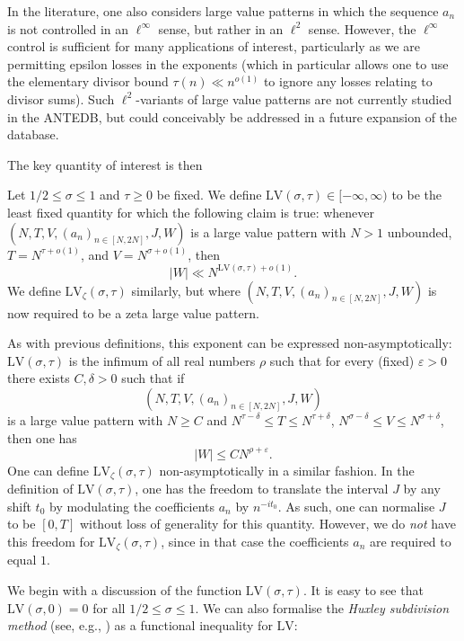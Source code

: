 \documentclass[a4paper, 10pt]{amsart}
\newcommand{\eps}{\varepsilon}
\newcommand{\LV}{\mathrm{LV}}
\begin{document}
\begin{remark}  In the literature, one also considers large value patterns in which the sequence $a_n$ is not controlled in an $\ell^\infty$ sense, but rather in an $\ell^2$ sense.  However, the $\ell^\infty$ control is sufficient for many applications of interest, particularly as we are permitting epsilon losses in the exponents (which in particular allows one to use the elementary divisor bound $\tau(n) \ll n^{o(1)}$ to ignore any losses relating to divisor sums).  Such $\ell^2$-variants of large value patterns are not currently studied in the ANTEDB, but could conceivably be addressed in a future expansion of the database.
\end{remark}

The key quantity of interest is then

\begin{definition}\label{lv-def} Let $1/2 \leq \sigma \leq 1$ and $\tau \geq 0$ be fixed. We define $\LV(\sigma,\tau) \in [-\infty,\infty)$ to be the least fixed quantity for which the following claim is true: whenever $(N,T,V,(a_n)_{n \in [N,2N]},J,W)$ is a large value pattern with $N>1$ unbounded, $T = N^{\tau+o(1)}$, and $V = N^{\sigma+o(1)}$, then
$$ |W| \ll N^{\LV(\sigma,\tau)+o(1)}.$$
We define $\LV_\zeta(\sigma,\tau)$ similarly, but where $(N,T,V,(a_n)_{n \in [N,2N]},J,W)$ is now required to be a zeta large value pattern.
\end{definition}

As with previous definitions, this exponent can be expressed non-asymptotically: $\LV(\sigma,\tau)$ is the infimum of all real numbers $\rho$ such that for every (fixed)  $\eps>0$ there exists $C, \delta>0$ such that if
$$(N,T,V,(a_n)_{n \in [N,2N]},J,W)$$
is a large value pattern with $N \geq C$ and $N^{\tau-\delta} \leq T \leq N^{\tau+\delta}$, $N^{\sigma-\delta} \leq V \leq N^{\sigma+\delta}$, then one has
$$ |W| \leq C N^{\rho+\eps}.$$
One can define $\LV_\zeta(\sigma,\tau)$ non-asymptotically in a similar fashion.
In the definition of $\LV(\sigma,\tau)$, one has the freedom to translate the interval $J$ by any shift $t_0$ by modulating the coefficients $a_n$ by $n^{-it_0}$.  As such, one can normalise $J$ to be $[0,T]$ without loss of generality for this quantity.  However, we do \emph{not} have this freedom for $\LV_\zeta(\sigma,\tau)$, since in that case the coefficients $a_n$ are required to equal $1$.

We begin with a discussion of the function $\LV(\sigma,\tau)$.
It is easy to see that $\LV(\sigma,0)=0$ for all $1/2 \leq\sigma \leq 1$.  We can also formalise the \emph{Huxley subdivision method} (see, e.g., \cite[Corollary 9.9]{ik}) as a functional inequality for $\LV$:
\end{document}
